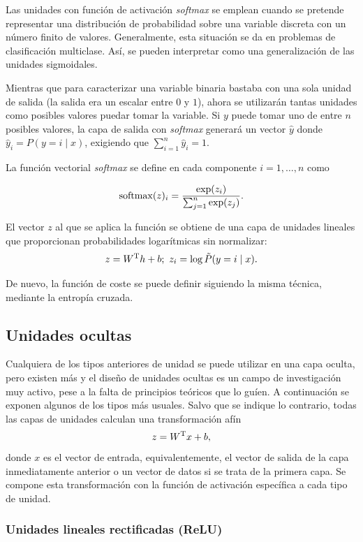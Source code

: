 Las unidades con función de activación \emph{softmax} se emplean cuando
se pretende representar una distribución de probabilidad sobre una
variable discreta con un número finito de valores. Generalmente, esta
situación se da en problemas de clasificación multiclase. Así, se pueden
interpretar como una generalización de las unidades sigmoidales.

Mientras que para caracterizar una variable binaria bastaba con una sola
unidad de salida (la salida era un escalar entre $0$ y $1$), ahora se
utilizarán tantas unidades como posibles valores puedar tomar la variable. Si
\(y\) puede tomar uno de entre \(n\) posibles valores, la capa de salida
con \emph{softmax} generará un vector \(\hat y\) donde
\(\hat y_i=P(y=i\mid x)\), exigiendo que \(\sum_{i=1}^n\hat y_i=1\).

La función vectorial \emph{softmax} se define en cada componente
\(i=1,\dots,n\) como

\begin{equation}\label{eq:softmax}
  \mathrm{softmax}(z)_i = \frac{\exp(z_i)}{\sum_{j=1}^{n}\exp(z_j)}.
\end{equation}

El vector \(z\) al que se aplica la función se obtiene de una capa de
unidades lineales que proporcionan probabilidades logarítmicas sin
normalizar:
\[z=W^{\mathrm{T}}h+b;\ z_{i}=\log\tilde P(y=i\mid x).\]

De nuevo, la
función de coste se puede definir siguiendo la misma técnica, mediante
la entropía cruzada.

\subsection{Unidades ocultas}\label{unidades-ocultas}

Cualquiera de los tipos anteriores de unidad se puede utilizar en una
capa oculta, pero existen más y el diseño de unidades ocultas es un
campo de investigación muy activo, pese a la falta de principios
teóricos que lo guíen. A continuación se exponen algunos de los tipos
más usuales. Salvo que se indique lo contrario, todas las capas de
unidades calculan una transformación afín \[z= W^{\mathrm{T}}x+b,\] donde \(x\) es
el vector de entrada, equivalentemente, el vector de salida de la capa
inmediatamente anterior o un vector de datos si se trata de la primera
capa. Se compone esta transformación con la función de activación
específica a cada tipo de unidad.

\subsubsection{Unidades lineales rectificadas
(ReLU)}\label{unidades-lineales-rectificadas-relu}


